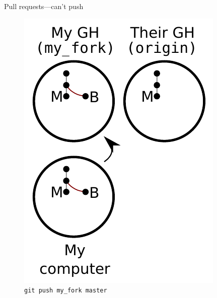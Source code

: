 \begin{frame}{Pull requests---can't push}
  \begin{figure}
    \includegraphics{fork_008.pdf}
    \\ \texttt{git push my\_fork master}
    \\ \texttt{}
  \end{figure}
\end{frame}


